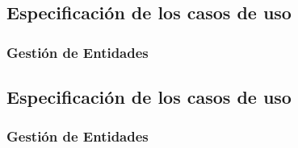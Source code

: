 \subsection{Especificación de los casos de uso}
\subsubsection{Gestión de Entidades}


\subsection{Especificación de los casos de uso}
\subsubsection{Gestión de Entidades}


\newpage